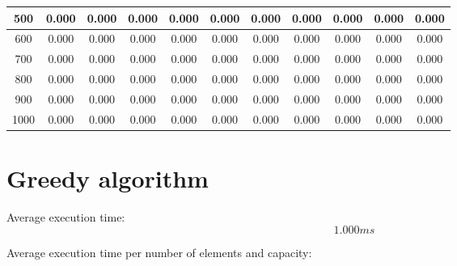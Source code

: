 \documentclass[11pt]{article}
\begin{document}
\begin{table}[h!]
\begin{tabular}{c|cccccccccc|}
\multicolumn{1}{|c|}{500} & \multicolumn{1}{c|}{0.000} & \multicolumn{1}{c|}{0.000} & \multicolumn{1}{c|}{0.000} & \multicolumn{1}{c|}{0.000} & \multicolumn{1}{c|}{0.000} & \multicolumn{1}{c|}{0.000} & \multicolumn{1}{c|}{0.000} & \multicolumn{1}{c|}{0.000} & \multicolumn{1}{c|}{0.000}  & 0.000 \\ \hline
\multicolumn{1}{|c|}{600} & \multicolumn{1}{c|}{0.000} & \multicolumn{1}{c|}{0.000} & \multicolumn{1}{c|}{0.000} & \multicolumn{1}{c|}{0.000} & \multicolumn{1}{c|}{0.000} & \multicolumn{1}{c|}{0.000} & \multicolumn{1}{c|}{0.000} & \multicolumn{1}{c|}{0.000} & \multicolumn{1}{c|}{0.000}  & 0.000 \\ \hline
\multicolumn{1}{|c|}{700} & \multicolumn{1}{c|}{0.000} & \multicolumn{1}{c|}{0.000} & \multicolumn{1}{c|}{0.000} & \multicolumn{1}{c|}{0.000} & \multicolumn{1}{c|}{0.000} & \multicolumn{1}{c|}{0.000} & \multicolumn{1}{c|}{0.000} & \multicolumn{1}{c|}{0.000} & \multicolumn{1}{c|}{0.000}  & 0.000 \\ \hline
\multicolumn{1}{|c|}{800} & \multicolumn{1}{c|}{0.000} & \multicolumn{1}{c|}{0.000} & \multicolumn{1}{c|}{0.000} & \multicolumn{1}{c|}{0.000} & \multicolumn{1}{c|}{0.000} & \multicolumn{1}{c|}{0.000} & \multicolumn{1}{c|}{0.000} & \multicolumn{1}{c|}{0.000} & \multicolumn{1}{c|}{0.000}  & 0.000 \\ \hline
\multicolumn{1}{|c|}{900} & \multicolumn{1}{c|}{0.000} & \multicolumn{1}{c|}{0.000} & \multicolumn{1}{c|}{0.000} & \multicolumn{1}{c|}{0.000} & \multicolumn{1}{c|}{0.000} & \multicolumn{1}{c|}{0.000} & \multicolumn{1}{c|}{0.000} & \multicolumn{1}{c|}{0.000} & \multicolumn{1}{c|}{0.000}  & 0.000 \\ \hline
\multicolumn{1}{|c|}{1000} & \multicolumn{1}{c|}{0.000} & \multicolumn{1}{c|}{0.000} & \multicolumn{1}{c|}{0.000} & \multicolumn{1}{c|}{0.000} & \multicolumn{1}{c|}{0.000} & \multicolumn{1}{c|}{0.000} & \multicolumn{1}{c|}{0.000} & \multicolumn{1}{c|}{0.000} & \multicolumn{1}{c|}{0.000}  & 0.000 \\ \hline
\end{tabular}
\end{table}

\newpage
\section{Greedy algorithm}

Average execution time:
\[1.000 ms\]

Average execution time per number of elements and capacity:
\end{document}
